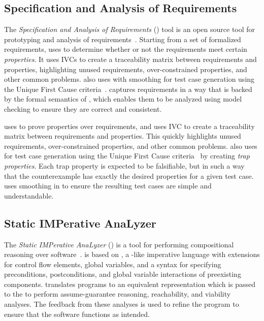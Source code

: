 \subsection{Specification and Analysis of Requirements}

The {\em Specification and Analysis of Requirements} (\spear) tool is an open source tool for prototyping and analysis of requirements~\cite{fifarek2017nfm}.  Starting from a set of formalized requirements, \spear uses \jkind to determine whether or not the requirements meet certain {\em properties}.  It uses IVCs to create a traceability matrix between requirements and properties, highlighting unused requirements, over-constrained properties, and other common problems. \spear also uses \jkind with smoothing for test case generation using the Unique First Cause criteria~\cite{whalen2006issta}.
%
\spear captures
requirements in a way that is backed by the formal semantics of
\lustre, which enables them to be analyzed using model checking to
ensure they are correct and consistent.

\spear uses \jkind to prove properties over requirements, and uses IVC
to create a traceability matrix between requirements and properties.
This quickly highlights unused requirements, over-constrained
properties, and other common problems. \spear also uses \jkind for
test case generation using the Unique First Cause
criteria~\cite{whalen2006issta} by creating {\em trap properties}.
Each trap property is expected to be falsifiable, but in such a way
that the counterexample has exactly the desired properties for a given
test case. \spear uses smoothing in \jkind to ensure the resulting
test cases are simple and understandable.


\subsection{Static IMPerative AnaLyzer}

The {\em Static IMPerative AnaLyzer} (\simpal) is a tool for
performing compositional reasoning over
software~\cite{wagner2017spin}. \simpal is based on \limp, a \lustre-like imperative language with extensions for control flow elements, global variables, and a syntax for specifying preconditions, postconditions, and global variable interactions of
preexisting components. \simpal translates \limp programs to an
equivalent \lustre representation which is passed to the \jkind to
perform assume-guarantee reasoning, reachability, and viability
analyses. The feedback from these analyses is used to refine the
program to ensure that the software functions as intended.

